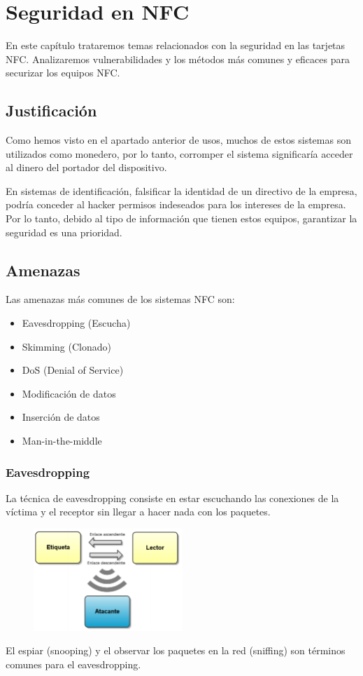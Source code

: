 \chapter{Seguridad en NFC}\label{ch:seguridad}
En este capítulo trataremos temas relacionados con la seguridad en las tarjetas NFC. Analizaremos vulnerabilidades y los métodos más comunes y eficaces para securizar los equipos NFC.
\clearpage
\section{Justificación}
Como hemos visto en el apartado anterior de usos, muchos de estos sistemas son utilizados como monedero, por lo tanto, corromper el sistema significaría acceder al dinero del portador del dispositivo.\par
En sistemas de identificación, falsificar la identidad de un directivo de la empresa, podría conceder al hacker permisos indeseados para los intereses de la empresa. Por lo tanto, debido al tipo de información que tienen estos equipos, garantizar la seguridad es una prioridad.
\section{Amenazas}
Las amenazas más comunes de los sistemas NFC son:
\begin{itemize}
	\item Eavesdropping (Escucha)
	\item Skimming (Clonado)
	\item DoS (Denial of Service)
	\item Modificación de datos
	\item Inserción de datos
	\item Man-in-the-middle
\end{itemize}
\subsection{Eavesdropping}
La técnica de eavesdropping consiste en estar escuchando las conexiones de la víctima y el receptor sin llegar a hacer nada con los paquetes.\\

\begin{figure}[!h]
	\centering
	\includegraphics[width=0.5\textwidth]{figures/eavesdropping.png}
\end{figure}
\clearpage
El espiar (snooping) y el observar los paquetes en la red (sniffing) son términos comunes para el eavesdropping.

